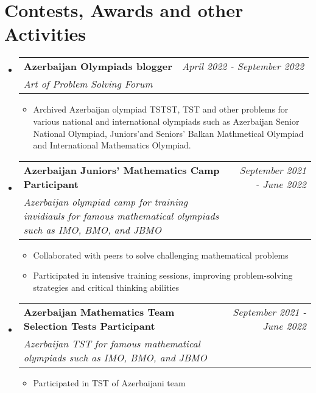 \documentclass[a4paper,11pt]{article}
\makeatletter
\newcommand{\resumeProject}[4]{
    \vspace{0.5mm}
\item
    \begin{tabular*}{0.98\textwidth}[t]{l@{\extracolsep{\fill}}r}
        \textbf{#1} & \textit{\footnotesize{#3}} \\
        \footnotesize{\textit{#2}} & \footnotesize{#4}
    \end{tabular*}
    \vspace{-2.4mm}
}
\newcommand{\resumeSubHeadingListStart}{
\begin{itemize}[leftmargin=*,labelsep=1mm]}
\newcommand{\resumeItemListStart}{
                \begin{itemize}[leftmargin=*,labelsep=1mm,itemsep=0.5mm]}
\newcommand{\resumeSubHeadingListEnd}{
                    \end{itemize}\vspace{2mm}}
\newcommand{\resumeItemListEnd}{
    \end{itemize}\vspace{-2mm}}
\makeatother
\begin{document}
\section{\textbf{Contests, Awards and other Activities}}
\vspace{-0.4mm}
\resumeSubHeadingListStart
\resumeProject
{Azerbaijan Olympiads blogger}
{Art of Problem Solving Forum}
{April 2022 - September 2022}
{{}\href{https://artofproblemsolving.com/community/user/948405}{\textcolor{darkblue}{\faIcon{globe}}}}

\resumeItemListStart
\item Archived Azerbaijan olympiad TSTST, TST and other problems for various national and international olympiads such as Azerbaijan Senior
National Olympiad, Juniors'and Seniors' Balkan Mathmetical Olympiad and International Mathematics Olympiad.
\resumeItemListEnd

\resumeProject
{Azerbaijan Juniors' Mathematics Camp Participant}
{Azerbaijan olympiad camp for training invidiauls for famous mathematical olympiads such as IMO, BMO, and JBMO}
{September 2021 - June 2022}
{}
\resumeItemListStart
\item Collaborated with peers to solve challenging mathematical problems
\item Participated in intensive training sessions, improving problem-solving strategies and critical thinking abilities

\resumeItemListEnd
\resumeProject
{Azerbaijan Mathematics Team Selection Tests Participant}
{Azerbaijan TST for famous mathematical olympiads such as IMO, BMO, and JBMO}
{September 2021 - June 2022}
{}
\resumeItemListStart
\item Participated in TST of Azerbaijani team
\resumeItemListEnd
\resumeSubHeadingListEnd
\vspace{-6mm}
\end{document}
